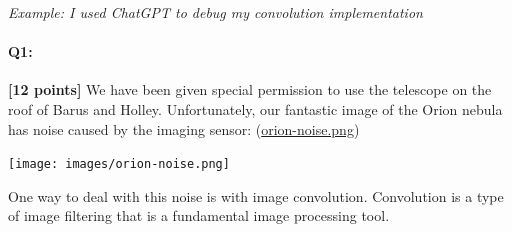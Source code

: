 \documentclass[11pt]{article}
\begin{document}
\textit{Example: I used ChatGPT to debug my convolution implementation}

\pagebreak

\paragraph{Q1:} \textbf{[12 points]} 
We have been given special permission to use the telescope on the roof of Barus and Holley. Unfortunately, our fantastic image of the Orion nebula has noise caused by the imaging sensor: (\href{run:images/orion-noise.png}{orion-noise.png})

\begin{center}
\texttt{[image: images/orion-noise.png]}
\end{center}

One way to deal with this noise is with image convolution. 
Convolution is a type of image filtering that is a fundamental image processing tool.
\end{document}
